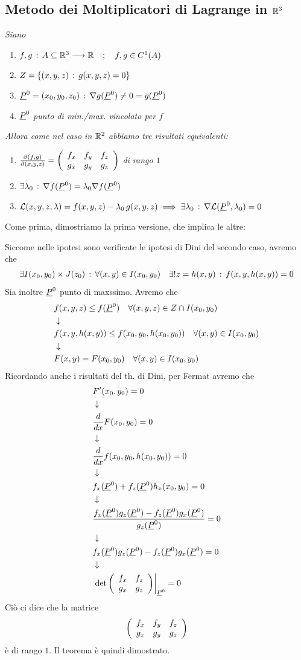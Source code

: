 \newpage

\subsection{Metodo dei Moltiplicatori di Lagrange in $\mathbb{R}^3$}

\textit{Siano}
\begin{enumerate}
	\item $f,g \, : \, A\subseteq \mathbb{R}^{3} \longrightarrow \mathbb{R}^{} \quad ; \quad f,g\in C^1(A)$
	\item $Z= \{ (x,y,z) \, : \, g(x,y,z)=0 \}$
	\item $\underline{P}^0=(x_0,y_0,z_0) \, : \, \nabla g(\underline{P}^0)\neq 0 = g(\underline{P}^0)$
	\item $\underline{P}^0$ \textit{punto di min./max. vincolato per $f$}
\end{enumerate}
\textit{Allora come nel caso in $\mathbb{R}^2$ abbiamo tre risultati equivalenti:}
\begin{enumerate}
	\item $\frac{\partial (f,g)}{\partial (x,y,z)}= \left( \begin{array}{ccc} f_x & f_y & f_z\\ g_x & g_y & g_z\\ \end{array} \right)$ \textit{ di rango $1$}
	\item $\exists \lambda_0 \, : \, \nabla f(\underline{P}^0)=\lambda_0 \nabla f(\underline{P}^0)$
	\item $\mathcal{L}(x,y,z,\lambda)= f(x,y,z) - \lambda_0 \, g(x,y,z) \implies \exists \lambda_0 \, : \, \nabla \mathcal{L}(\underline{P}^0,\lambda_0)=0$
\end{enumerate}

\bigskip

Come prima, dimostriamo la prima versione, che implica le altre:

\bigskip

Siccome nelle ipotesi sono verificate le ipotesi di Dini del secondo caso, avremo che
\begin{align}
	\exists I(x_0,y_0)\times J(z_0) \, : \, \forall (x,y)\in I(x_0,y_0) \quad \exists ! z= h(x,y) \, : \, f(x,y,h(x,y))=0
\end{align}
Sia inoltre $\underline{P}^0$ punto di maxssimo. Avremo che
\begin{align}
	{}&f(x,y,z)\leq f(\underline{P}^0) \quad \forall (x,y,z) \in Z \cap I(x_0,y_0) \nonumber \\ &\downarrow \nonumber \\
	&f(x,y,h(x,y))\leq f(x_0,y_0, h(x_0,y_0)) \quad \forall (x,y) \in I(x_0,y_0) \nonumber \\ &\downarrow \nonumber \\
	&F(x,y)= F(x_0,y_0) \quad \forall (x,y) \in I(x_0,y_0)
\end{align}
Ricordando anche i risultati del th. di Dini, per Fermat avremo che
\begin{align}
	{}&F'(x_0,y_0)=0 \nonumber \\ &\downarrow \nonumber \\
	&\frac{d }{d x} F(x_0,y_0)=0 \nonumber \\ &\downarrow \nonumber \\
	& \frac{d }{d x} f(x_0,y_0, h(x_0,y_0)) = 0 \nonumber \\ &\downarrow \nonumber \\
	& f_x(\underline{P}^0) + f_z(\underline{P}^0) h_x(x_0,y_0)=0 \nonumber \\ &\downarrow \nonumber \\
	& \frac{ f_x(\underline{P}^0)g_z(\underline{P}^0) - f_z(\underline{P}^0)g_x(\underline{P}^0)}{g_z(\underline{P}^0)}=0\nonumber \\ &\downarrow \nonumber \\
	& f_x(\underline{P}^0)g_z(\underline{P}^0) - f_z(\underline{P}^0)g_x(\underline{P}^0)=0 \nonumber \\ &\downarrow \nonumber \\
	&\left. \det \left( \begin{array}{ccc} f_x & f_z \\ g_x & g_z \end{array} \right)\right|_{\underline{P}^0}=0 
\end{align}
Ciò ci dice che la matrice
\begin{align}
	\left( \begin{array}{ccc} f_x & f_y & f_z\\ g_x & g_y & g_z\\ \end{array} \right)
\end{align}
è di rango $1$. Il teorema è quindi dimostrato.

